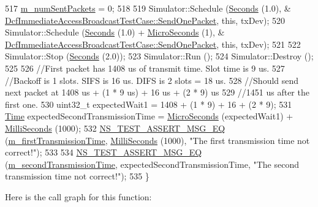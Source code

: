 \begin{DoxyCode}
517   \hyperlink{classDcfImmediateAccessBroadcastTestCase_a8934bfdda7efae56e84c18a799379780}{m\_numSentPackets} = 0;
518 
519   Simulator::Schedule (\hyperlink{group__timecivil_ga33c34b816f8ff6628e33d5c8e9713b9e}{Seconds} (1.0), &
      \hyperlink{classDcfImmediateAccessBroadcastTestCase_ac1f6f4b2af66dda401e082762cee8adb}{DcfImmediateAccessBroadcastTestCase::SendOnePacket}, \textcolor{keyword}{this},
       txDev);
520   Simulator::Schedule (\hyperlink{group__timecivil_ga33c34b816f8ff6628e33d5c8e9713b9e}{Seconds} (1.0) + \hyperlink{group__timecivil_ga17465a639c8d1464e76538afdd78a9f0}{MicroSeconds} (1), &
      \hyperlink{classDcfImmediateAccessBroadcastTestCase_ac1f6f4b2af66dda401e082762cee8adb}{DcfImmediateAccessBroadcastTestCase::SendOnePacket}, \textcolor{keyword}{this},
       txDev);
521 
522   Simulator::Stop (\hyperlink{group__timecivil_ga33c34b816f8ff6628e33d5c8e9713b9e}{Seconds} (2.0));
523   Simulator::Run ();
524   Simulator::Destroy ();
525 
526   \textcolor{comment}{//First packet has 1408 us of transmit time.   Slot time is 9 us.}
527   \textcolor{comment}{//Backoff is 1 slots.  SIFS is 16 us.  DIFS is 2 slots = 18 us.}
528   \textcolor{comment}{//Should send next packet at 1408 us + (1 * 9 us) + 16 us + (2 * 9) us}
529   \textcolor{comment}{//1451 us after the first one.}
530   uint32\_t expectedWait1 = 1408 + (1 * 9) + 16 + (2 * 9);
531   \hyperlink{classns3_1_1Time}{Time} expectedSecondTransmissionTime = \hyperlink{group__timecivil_ga17465a639c8d1464e76538afdd78a9f0}{MicroSeconds} (expectedWait1) + 
      \hyperlink{group__timecivil_gaf26127cf4571146b83a92ee18679c7a9}{MilliSeconds} (1000);
532   \hyperlink{group__testing_ga2a9d78cffb3db8e867c35fff0b698cf5}{NS\_TEST\_ASSERT\_MSG\_EQ} (\hyperlink{classDcfImmediateAccessBroadcastTestCase_a90fe73456a50aa8d866a4488a636da18}{m\_firstTransmissionTime}, 
      \hyperlink{group__timecivil_gaf26127cf4571146b83a92ee18679c7a9}{MilliSeconds} (1000), \textcolor{stringliteral}{"The first transmission time not correct!"});
533 
534   \hyperlink{group__testing_ga2a9d78cffb3db8e867c35fff0b698cf5}{NS\_TEST\_ASSERT\_MSG\_EQ} (\hyperlink{classDcfImmediateAccessBroadcastTestCase_a89eee6c68fefdc0af43f7b610a3ec686}{m\_secondTransmissionTime}, 
      expectedSecondTransmissionTime, \textcolor{stringliteral}{"The second transmission time not correct!"});
535 \}
\end{DoxyCode}


Here is the call graph for this function\+:


